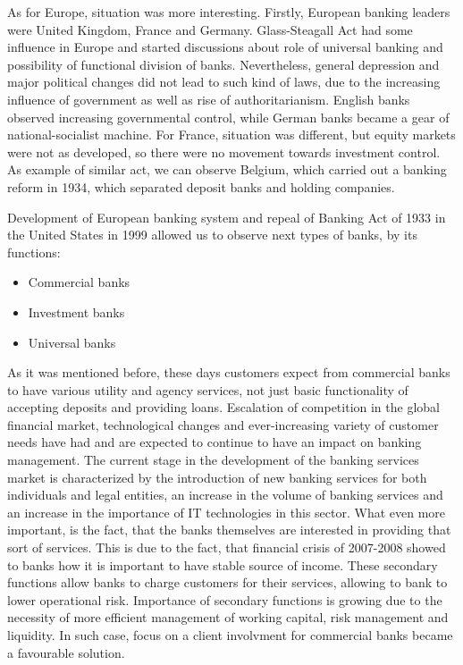 As for Europe, situation was more interesting. Firstly, European banking leaders were United Kingdom, France and Germany. Glass-Steagall Act had some influence in Europe and started discussions about role of universal banking and possibility of functional division of banks. Nevertheless, general depression and major political changes did not lead to such kind of laws, due to the increasing influence of government as well as rise of authoritarianism. English banks observed increasing governmental control, while German banks became a gear of national-socialist machine. For France, situation was different, but equity markets were not as developed, so there were no movement towards investment control. As example of similar act, we can observe Belgium, which carried out a banking reform in 1934, which separated deposit banks and holding companies.

Development of European banking system and repeal of Banking Act of 1933 in the United States in 1999 allowed us to observe next types of banks, by its functions:

\begin{itemize}
    \item Commercial banks
    \item Investment banks
    \item Universal banks
\end{itemize}	

As it was mentioned before, these days customers expect from commercial banks to have various utility and agency services, not just basic functionality of accepting deposits and providing loans. Escalation of competition in the global financial market, technological changes and ever-increasing variety of customer needs have had and are expected to continue to have an impact on banking management. The current stage in the development of the banking services market is characterized by the introduction of new banking services for both individuals and legal entities, an increase in the volume of banking services and an increase in the importance of IT technologies in this sector. 
What even more important, is the fact, that the banks themselves are interested in providing that sort of services. This is due to the fact, that financial crisis of 2007-2008 showed to banks how it is important to have stable source of income. These secondary functions allow banks to charge customers for their services, allowing to bank to lower operational risk. Importance of secondary functions is growing due to the necessity of more efficient management of working capital, risk management and liquidity. 
In such case, focus on a client involvment for commercial banks became a favourable solution.

